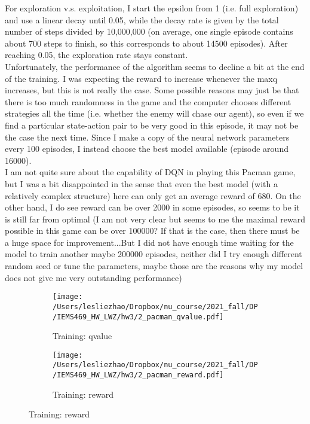\documentclass[12pt,letterpaper]{article}
\begin{document}
For exploration v.s. exploitation, I start the epsilon from 1 (i.e. full exploration) and use a linear decay until 0.05, while the decay rate is given by the total number of steps divided by 10,000,000 (on average, one single episode contains about 700 steps to finish, so this corresponds to about 14500 episodes). After reaching 0.05, the exploration rate stays constant. \\

Unfortunately, the performance of the algorithm seems to decline a bit at the end of the training. I was expecting the reward to increase whenever the maxq increases, but this is not really the case. Some possible reasons may just be that there is too much randomness in the game and the computer chooses different strategies all the time (i.e. whether the enemy will chase our agent), so even if we find a particular state-action pair to be very good in this episode, it may not be the case the next time. Since I make a copy of the neural network parameters every 100 episodes, I instead choose the best model available (episode around 16000). \\

I am not quite sure about the capability of DQN in playing this Pacman game, but I was a bit disappointed in the sense that even the best model (with a relatively complex structure) here 
can only get an average reward of 680. On the other hand, I do see reward can be over 2000 in some episodes, so seems to be it is still far from optimal (I am not very clear but seems to me the maximal reward possible in this game can be over 100000? If that is the case, then there must be a huge space for improvement...But I did not have enough time waiting for the model to train another maybe 200000 episodes, neither did I try enough different random seed or tune the parameters, maybe those are the reasons why my model does not give me very outstanding performance) 

 \begin{figure}[H]
	\centering
	\caption{Pacman game}
	\begin{subfigure}[h]{0.9\textwidth}
		\centering
		\texttt{[image: /Users/lesliezhao/Dropbox/nu\_course/2021\_fall/DP/IEMS469\_HW\_LWZ/hw3/2\_pacman\_qvalue.pdf]}
		\caption{Training: qvalue}
	\end{subfigure}
	\begin{subfigure}[h]{0.9\textwidth}
	\centering
	\texttt{[image: /Users/lesliezhao/Dropbox/nu\_course/2021\_fall/DP/IEMS469\_HW\_LWZ/hw3/2\_pacman\_reward.pdf]}
	\caption{Training: reward}
\end{subfigure}
\end{figure}
\end{document}
